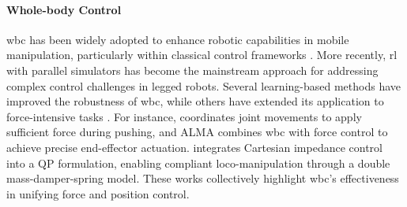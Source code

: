 \documentclass{article}
\begin{document}
\paragraph{Whole-body Control}
\ac{wbc} has been widely adopted to enhance robotic capabilities in mobile manipulation, particularly within classical control frameworks \cite{sleiman2021unified,polverini2020multi, sleiman2023versatile}. More recently, \ac{rl} with parallel simulators \cite{makoviychuk2021isaac, rudin2022learning} has become the mainstream approach for addressing complex control challenges in legged robots. Several learning-based methods \cite{fu2023deep,pan2024roboduet, ma2022combining,liu2024visual,wang2024quadwbg} have improved the robustness of \ac{wbc}, while others have extended its application to force-intensive tasks \cite{murphy2012high,murooka2015whole, rehman2016towards,bellicoso2019alma,risiglione2022whole}. For instance, \cite{murooka2015whole} coordinates joint movements to apply sufficient force during pushing, and ALMA\cite{bellicoso2019alma} combines \ac{wbc} with force control to achieve precise end-effector actuation. \cite{risiglione2022whole} integrates Cartesian impedance control into a QP formulation, enabling compliant loco-manipulation through a double mass-damper-spring model. These works collectively highlight \ac{wbc}’s effectiveness in unifying force and position control.

\end{document}
